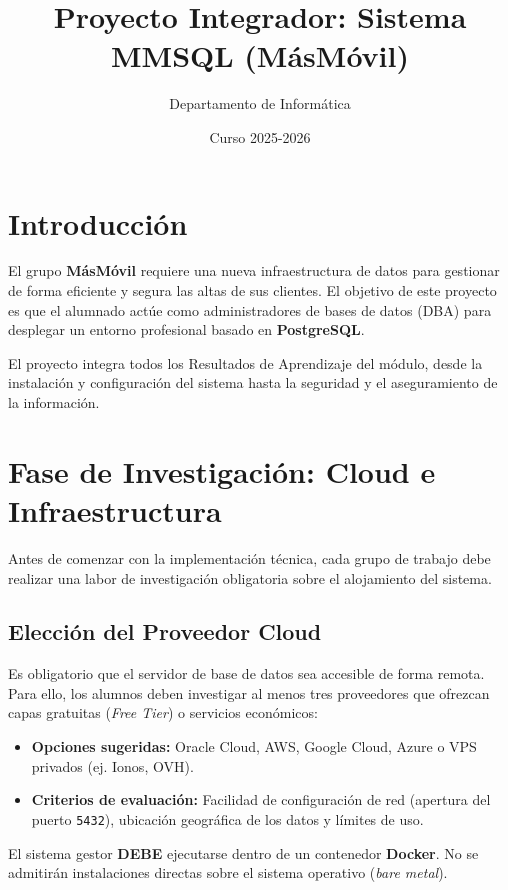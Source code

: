 \documentclass[12pt,a4paper,spanish,es-tabla,es-noshorthands]{article}
\title{\textbf{Proyecto Integrador: Sistema MMSQL (MásMóvil)}}
\author{Departamento de Informática}
\date{Curso 2025-2026}
\begin{document}
\maketitle

\section*{Introducción}
El grupo \textbf{MásMóvil} requiere una nueva infraestructura de datos para gestionar de forma eficiente y segura las altas de sus clientes. El objetivo de este proyecto es que el alumnado actúe como administradores de bases de datos (DBA) para desplegar un entorno profesional basado en \textbf{PostgreSQL}. 

El proyecto integra todos los Resultados de Aprendizaje del módulo, desde la instalación y configuración del sistema hasta la seguridad y el aseguramiento de la información.

\section{Fase de Investigación: Cloud e Infraestructura}
Antes de comenzar con la implementación técnica, cada grupo de trabajo debe realizar una labor de investigación obligatoria sobre el alojamiento del sistema.

\subsection{Elección del Proveedor Cloud}
Es obligatorio que el servidor de base de datos sea accesible de forma remota. Para ello, los alumnos deben investigar al menos tres proveedores que ofrezcan capas gratuitas (\textit{Free Tier}) o servicios económicos:
\begin{itemize}
    \item \textbf{Opciones sugeridas:} Oracle Cloud, AWS, Google Cloud, Azure o VPS privados (ej. Ionos, OVH).
    \item \textbf{Criterios de evaluación:} Facilidad de configuración de red (apertura del puerto \texttt{5432}), ubicación geográfica de los datos y límites de uso.
\end{itemize}

\begin{tcolorbox}[title=Requisito de Infraestructura]
El sistema gestor \textbf{DEBE} ejecutarse dentro de un contenedor \textbf{Docker}. No se admitirán instalaciones directas sobre el sistema operativo (\textit{bare metal}).
\end{tcolorbox}
\end{document}
